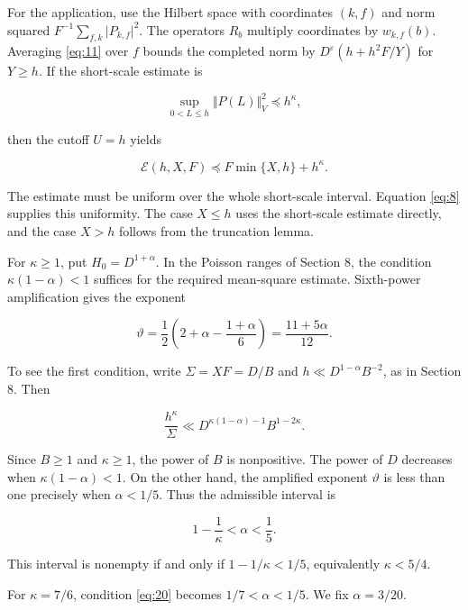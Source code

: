\documentclass[reqno,a4paper,11pt]{amsart}
\begin{document}
For the application, use the Hilbert space with coordinates $(k,f)$ and norm squared ${F}^{-1}\sum _{f,k} |{P}_{k,f}{|}^{2}$. The operators ${R}_{b}$ multiply coordinates by ${w}_{k,f}(b)$. Averaging \eqref{eq:11} over $f$ bounds the completed norm by ${D}^{\varepsilon }(h+{h}^{2}F/Y)$ for $Y\ge h$. If the short-scale estimate is

\[
{\sup }_{0<L\le h}\Vert P\left( L\right) {\Vert }_{V}^{2}\preccurlyeq {h}^{\kappa },
\]

then the cutoff $U=h$ yields

\begin{equation}\label{eq:19}
\mathcal{E}\left( h,X,F\right) \preccurlyeq F\min \{X,h\}+{h}^{\kappa }.
\end{equation}

The estimate must be uniform over the whole short-scale interval. Equation \eqref{eq:8} supplies this uniformity. The case $X\le h$ uses the short-scale estimate directly, and the case $X>h$ follows from the truncation lemma.

For $\kappa \ge 1$, put ${H}_{0}={D}^{1+\alpha }$. In the Poisson ranges of Section 8, the condition $\kappa (1-\alpha )<1$ suffices for the required mean-square estimate. Sixth-power amplification gives the exponent

\[
\vartheta =\frac{1}{2}\left( 2+\alpha -\frac{1+\alpha }{6}\right) =\frac{11+5\alpha }{12}.
\]

To see the first condition, write $\Sigma=XF=D/B$ and $h\ll D^{1-\alpha}B^{-2}$, as in Section 8. Then

\begin{equation}\label{eq:kappa-ratio}
\frac{h^{\kappa}}{\Sigma}\ll D^{\kappa(1-\alpha)-1}B^{1-2\kappa}.
\end{equation}

Since $B\ge1$ and $\kappa\ge1$, the power of $B$ is nonpositive. The power of $D$ decreases when $\kappa(1-\alpha)<1$. On the other hand, the amplified exponent $\vartheta$ is less than one precisely when $\alpha<1/5$. Thus the admissible interval is

\begin{equation}\label{eq:20}
1-\frac{1}{\kappa}<\alpha<\frac{1}{5}.
\end{equation}

This interval is nonempty if and only if $1-1/\kappa<1/5$, equivalently $\kappa<5/4$.

For $\kappa =7/6$, condition \eqref{eq:20} becomes $1/7<\alpha <1/5$. We fix $\alpha =3/20$.
\end{document}
